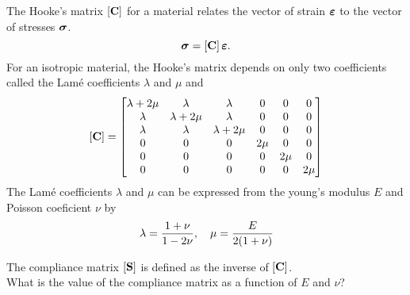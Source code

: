 \bexo
The Hooke's matrix $\left[ \textbf{C} \right]$ for 
a material relates the vector of strain $\boldsymbol{\varepsilon}$ to the vector of stresses $\boldsymbol{\sigma}$. 
\begin{equation}
	\boldsymbol{\sigma}=\left[ \textbf{C} \right]\boldsymbol{\varepsilon}.
\end{equation}
For an isotropic material, the Hooke's matrix depends on only two coefficients called the Lam\'e coefficients $\lambda$ and $\mu$ and
\begin{equation}
	\left[ \textbf{C} \right]=
	\begin{bmatrix}
		\lambda+2\mu & \lambda & \lambda &0&0&0\\
		 \lambda &\lambda+2\mu & \lambda &0&0&0\\
		 \lambda &\lambda &\lambda+2\mu & 0&0&0\\
		 0&0&0&2\mu &0&0\\
		 0&0&0&0&2\mu &0\\
		 0&0&0&0&0&2\mu  
	\end{bmatrix}
\end{equation}
The Lam\'e coefficients $\lambda$ and $\mu$ can be expressed from the young's modulus $E$ and Poisson coeficient $\nu$ by 
\begin{equation}
	\lambda=\dfrac{1+\nu}{1-2\nu}, \quad \mu=\dfrac{E}{2(1+\nu)}
\end{equation}


The compliance matrix $\left[ \textbf{S} \right]$ is defined as the inverse of $\left[ \textbf{C} \right]$. \\

What is the value of the compliance matrix as a function of $E$ and $\nu$?


\eexo 

	




